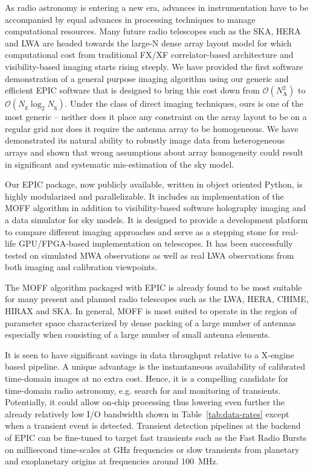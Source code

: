 \documentclass[a4paper,fleqn,usenatbib]{mnras}
\newcommand{\Nant}{N_\textrm{A}}
\newcommand{\Ngrid}{N_\textrm{g}}
\begin{document}
As radio astronomy is entering a new era, advances in instrumentation have to be accompanied by equal advances in processing techniques to manage computational resources. Many future radio telescopes such as the SKA, HERA and LWA are headed towards the large-N dense array layout model for which computational cost from traditional FX/XF correlator-based architecture and visibility-based imaging starts rising steeply. We have provided the first software demonstration of a general purpose imaging algorithm using our generic and efficient EPIC software that is designed to bring this cost down from $\mathcal{O}(\Nant^2)$ to $\mathcal{O}(\Ngrid\log_2 \Ngrid)$. Under the class of direct imaging techniques, ours is one of the most generic -- neither does it place any constraint on the array layout to be on a regular grid nor does it require the antenna array to be homogeneous. We have demonstrated its natural ability to robustly image data from heterogeneous arrays and shown that wrong assumptions about array homogeneity could result in significant and systematic mis-estimation of the sky model.

Our EPIC package, now publicly available, written in object oriented Python, is 
highly modularized and parallelizable. It includes an implementation of the 
MOFF algorithm in addition to visibility-based software holography imaging and 
a data simulator for sky models. It is designed to provide a development 
platform to compare different imaging approaches and serve as a stepping stone 
for real-life GPU/FPGA-based implementation on telescopes. It has been 
successfully tested on simulated MWA observations as well as real LWA 
observations from both imaging and calibration viewpoints. 

The MOFF algorithm packaged with EPIC is already found to be most suitable 
for many present and planned radio telescopes such as the LWA, HERA, CHIME,
HIRAX and SKA. In general, MOFF is most suited to operate in the region of 
parameter space characterized by dense packing of a large number of antennas 
especially when consisting of a large number of small antenna elements. 

It is seen to have significant savings in data throughput relative to a 
X-engine based pipeline. A unique advantage is the instantaneous availability 
of calibrated time-domain images at no extra cost. Hence, it is a compelling 
candidate for time-domain radio astronomy, e.g. search for and monitoring of 
transients. Potentially, it could allow on-chip processing thus lowering even 
further the already relatively low I/O bandwidth shown in 
Table~\ref{tab:data-rates} except when a transient event is detected. Transient 
detection pipelines at the backend of EPIC can be fine-tuned to target fast 
transients such as the Fast Radio Bursts \citep[FRB;][]{tho13} on millisecond 
time-scales at GHz frequencies or slow transients from planetary and exoplanetary 
origins at frequencies around 100~MHz. 
\end{document}
